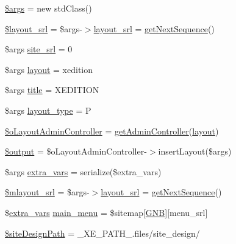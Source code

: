 \begin{DoxyCompactItemize}
\item 
\hyperlink{ko_8install_8php_a67e94494731d99ed23b123e95175bc10}{\$args} = new std\+Class()
\item 
\hyperlink{ko_8install_8php_a77889723c4aa360089caae223118d413}{\$layout\+\_\+srl} = \$args-\/$>$\hyperlink{ko_8install_8php_a70054876db09b2519a1726663c8dd9e7}{layout\+\_\+srl} = \hyperlink{func_8inc_8php_a5a97b458f9c5b4fe3574671840aee27c}{get\+Next\+Sequence}()
\item 
\$args \hyperlink{ko_8install_8php_a8b1406b4ad1048041558dce6bfe89004}{site\+\_\+srl} = 0
\item 
\$args \hyperlink{ko_8install_8php_a0dc2cdff7167f362443808ff71ae5177}{layout} = \textquotesingle{}xedition\textquotesingle{}
\item 
\$args \hyperlink{ko_8install_8php_a5b072c5fd1d2228c6ba5cee13cd142e3}{title} = \textquotesingle{}X\+E\+D\+I\+T\+I\+O\+N\textquotesingle{}
\item 
\$args \hyperlink{ko_8install_8php_a0532d89570cfdaebc628afac2ff5a81b}{layout\+\_\+type} = \textquotesingle{}P\textquotesingle{}
\item 
\hyperlink{ko_8install_8php_a6a03496003da7df71cf94d9accb430be}{\$o\+Layout\+Admin\+Controller} = \hyperlink{func_8inc_8php_a2f7ca88a5226536aca3b2f5682bd7b2d}{get\+Admin\+Controller}(\textquotesingle{}\hyperlink{classlayout}{layout}\textquotesingle{})
\item 
\hyperlink{ko_8install_8php_a73004ce9cd673c1bfafd1dc351134797}{\$output} = \$o\+Layout\+Admin\+Controller-\/$>$insert\+Layout(\$args)
\item 
\$args \hyperlink{ko_8install_8php_ae1dcb37fc34a8f312d2e6abd6f806743}{extra\+\_\+vars} = serialize(\$extra\+\_\+vars)
\item 
\hyperlink{ko_8install_8php_a576210f0eec2e42df2c40e04a3972bb0}{\$mlayout\+\_\+srl} = \$args-\/$>$\hyperlink{ko_8install_8php_a70054876db09b2519a1726663c8dd9e7}{layout\+\_\+srl} = \hyperlink{func_8inc_8php_a5a97b458f9c5b4fe3574671840aee27c}{get\+Next\+Sequence}()
\item 
\$\hyperlink{ko_8install_8php_ae1dcb37fc34a8f312d2e6abd6f806743}{extra\+\_\+vars} \hyperlink{ko_8install_8php_ac71104c770b8ced3891f35849d3f2906}{main\+\_\+menu} = \$sitemap\mbox{[}\textquotesingle{}\hyperlink{ko_8install_8php_a9b1716b68fc04f3492448f38148dcbf5}{G\+N\+B}\textquotesingle{}\mbox{]}\mbox{[}\textquotesingle{}menu\+\_\+srl\textquotesingle{}\mbox{]}
\item 
\hyperlink{ko_8install_8php_a0b79a974b91157b79d83cc0be7e3247c}{\$site\+Design\+Path} = \+\_\+\+X\+E\+\_\+\+P\+A\+T\+H\+\_\+.\textquotesingle{}files/site\+\_\+design/\textquotesingle{}

\end{DoxyCompactItemize}
